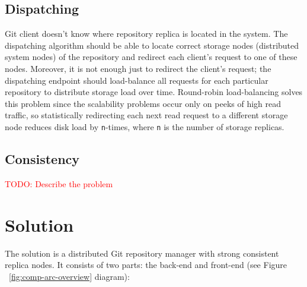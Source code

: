 \documentclass[acmlarge, screen, nonacm]{acmart}
\newcommand{\code}[1]{\texttt{#1}}
\newcommand{\todo}[1]{\textcolor{red}{TODO: #1}}
\begin{document}
\subsection{Dispatching}

Git client doesn't know where repository replica is located in the system. The dispatching algorithm
should be able to locate correct storage nodes (distributed system nodes) of the repository and redirect
each client's request to one of these nodes. Moreover, it is not enough just to redirect the client's request;
the dispatching endpoint should load-balance all requests for each particular repository to distribute
storage load over time. Round-robin load-balancing solves this problem since the scalability problems
occur only on peeks of high read traffic, so statistically redirecting each next read request to
a different storage node reduces disk load by \code{n}-times, where \code{n} is the number of storage replicas.

\subsection{Consistency}

\todo{Describe the problem}


\section{Solution}

The solution is a distributed Git repository manager with strong consistent replica nodes.
It consists of two parts: the back-end and front-end (see Figure ~\ref{fig:comp-arc-overview} diagram):
\end{document}

